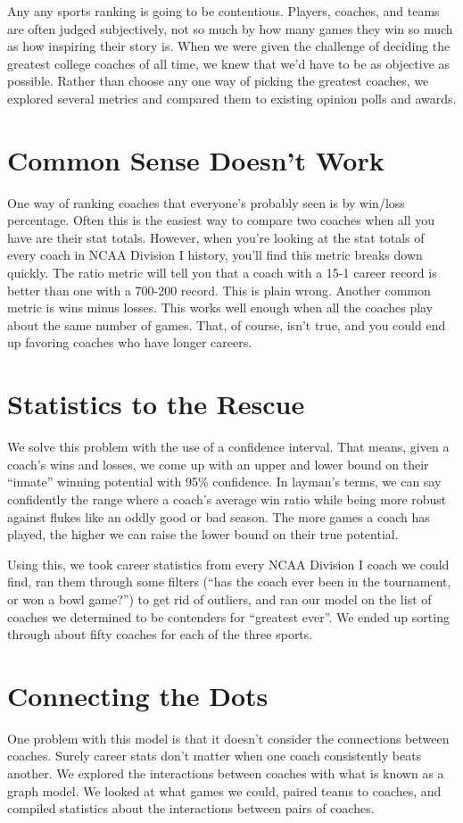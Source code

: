 \documentclass[12pt]{article}
\begin{document}
Any any sports ranking is going to be contentious. Players, coaches, and teams are often judged subjectively, not so much by how many games they win so much as how inspiring their story is. When we were given the challenge of deciding the greatest college coaches of all time, we knew that we'd have to be as objective as possible. Rather than choose any one way of picking the greatest coaches, we explored several metrics and compared them to existing opinion polls and awards.

\section{Common Sense Doesn't Work}
One way of ranking coaches that everyone's probably seen is by win/loss percentage. Often this is the easiest way to compare two coaches when all you have are their stat totals. However, when you're looking at the stat totals of every coach in NCAA Division I history, you'll find this metric breaks down quickly. The ratio metric will tell you that a coach with a 15-1 career record is better than one with a 700-200 record. This is plain wrong. Another common metric is wins minus losses. This works well enough when all the coaches play about the same number of games. That, of course, isn't true, and you could end up favoring coaches who have longer careers. 

\section{Statistics to the Rescue}
We solve this problem with the use of a confidence interval. That means, given a coach's wins and losses, we come up with an upper and lower bound on their ``innate'' winning potential with 95\% confidence. In layman's terms, we can say confidently the range where a coach's average win ratio while being more robust against flukes like an oddly good or bad season. The more games a coach has played, the higher we can raise the lower bound on their true potential. 

Using this, we took career statistics from every NCAA Division I coach we could find, ran them through some filters (``has the coach ever been in the tournament, or won a bowl game?'') to get rid of outliers, and ran our model on the list of coaches we determined to be contenders for ``greatest ever''. We ended up sorting through about fifty coaches for each of the three sports.

\section{Connecting the Dots}
One problem with this model is that it doesn't consider the connections between coaches. Surely career stats don't matter when one coach consistently beats another. We explored the interactions between coaches with what is known as a graph model. We looked at what games we could, paired teams to coaches, and compiled statistics about the interactions between pairs of coaches.
\end{document}
